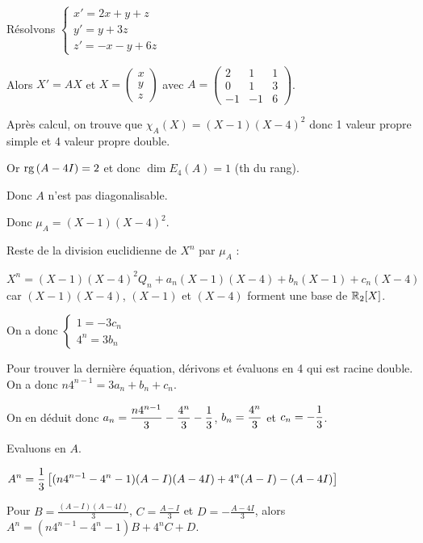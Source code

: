 \begin{exemple}
    Résolvons $\begin{cases}
        x' = 2x +y + z \\
        y' = y + 3z \\
        z' = -x - y + 6z
    \end{cases}$

    Alors $X' = AX$ et $X = \begin{pmatrix}
    x \\ y \\ z
    \end{pmatrix}$ avec $A = \begin{pmatrix}
    2 & 1 & 1 \\
    0 & 1 & 3 \\
    -1 & -1 & 6
    \end{pmatrix}$.

    Après calcul, on trouve que $\chi_A(X) = (X - 1)(X - 4)^2$ donc 1 valeur propre 
    simple et 4 valeur propre double. 

    Or $\operatorname{rg} \, (A - 4I) = 2$ et donc $\dim E_4(A) = 1$ (th du rang). 

    Donc $A$ n'est pas diagonalisable. 

    Donc $\mu_A = (X - 1)(X - 4)^2$.

    Reste de la division euclidienne de $X^n$ par $\mu_A$ : 

    $X^n = (X - 1)(X - 4)^2 Q_n + a_n(X - 1)(X - 4) + b_n(X - 1) + c_n(X - 4)$
    car $(X - 1)(X - 4)$, $(X - 1)$ et $(X - 4)$ forment une base de $\mathbb{R}_{2}[X]$.

    On a donc  $\begin{cases}
        1 = -3c_n \\
        4^n = 3 b_n
    \end{cases}$

    Pour trouver la dernière équation, dérivons et évaluons en 4 qui est racine double.
    On a donc $n 4^{n - 1} = 3 a_n + b_n + c_n$.

    On en déduit donc $\displaystyle a_n = \frac{n 4^{n - 1}}{3} - \frac{4^n}{3} - \frac 1 3$, 
    $\displaystyle b_n = \frac{4^n}{3}$ et $\displaystyle c_n = -\frac 1 3$.

    Evaluons en $A$. 

    $\displaystyle A^n = \frac 1 3 \left[ (n 4^{n - 1} - 4^n - 1)(A - I)(A - 4I) + 4^n (A - I) - (A - 4I) \right]$

    Pour $B = \frac{(A - I)(A - 4I)}{3}$, $C = \frac{A - I} 3$ et $D = -\frac{A - 4I}{3}$, alors
    $A^n = (n 4^{n - 1} - 4^n - 1) B + 4^n C + D$.


\end{exemple}
